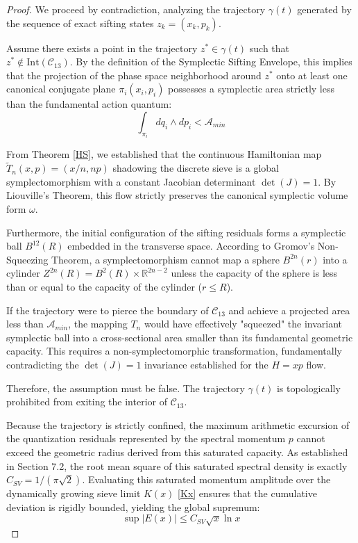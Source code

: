 \documentclass[sn-mathphys-num, pdflatex]{sn-jnl}
\begin{document}
\begin{proof}
We proceed by contradiction, analyzing the trajectory $\gamma(t)$ generated by the sequence of exact sifting states $z_k = (x_k, p_k)$. 

Assume there exists a point in the trajectory $z^* \in \gamma(t)$ such that $z^* \notin \text{Int}(\mathcal{C}_{13})$. By the definition of the Symplectic Sifting Envelope, this implies that the projection of the phase space neighborhood around $z^*$ onto at least one canonical conjugate plane $\pi_i(x_i, p_i)$ possesses a symplectic area strictly less than the fundamental action quantum:
$$ \int_{\pi_i} dq_i \wedge dp_i < \mathcal{A}_{min} $$

From Theorem \ref{HS}, we established that the continuous Hamiltonian map $\tilde{T}_n(x,p) = (x/n, np)$ shadowing the discrete sieve is a global symplectomorphism with a constant Jacobian determinant $\det(J) = 1$. By Liouville's Theorem, this flow strictly preserves the canonical symplectic volume form $\omega$. 

Furthermore, the initial configuration of the sifting residuals forms a symplectic ball $B^{12}(R)$ embedded in the transverse space. According to Gromov's Non-Squeezing Theorem, a symplectomorphism cannot map a sphere $B^{2n}(r)$ into a cylinder $Z^{2n}(R) = B^2(R) \times \mathbb{R}^{2n-2}$ unless the capacity of the sphere is less than or equal to the capacity of the cylinder ($r \le R$).

If the trajectory were to pierce the boundary of $\mathcal{C}_{13}$ and achieve a projected area less than $\mathcal{A}_{min}$, the mapping $T_n$ would have effectively "squeezed" the invariant symplectic ball into a cross-sectional area smaller than its fundamental geometric capacity. This requires a non-symplectomorphic transformation, fundamentally contradicting the $\det(J) = 1$ invariance established for the $H=xp$ flow.

Therefore, the assumption must be false. The trajectory $\gamma(t)$ is topologically prohibited from exiting the interior of $\mathcal{C}_{13}$. 

Because the trajectory is strictly confined, the maximum arithmetic excursion of the quantization residuals represented by the spectral momentum $p$ cannot exceed the geometric radius derived from this saturated capacity. As established in Section 7.2, the root mean square of this saturated spectral density is exactly $C_{SV} = 1/(\pi\sqrt{2})$. Evaluating this saturated momentum amplitude over the dynamically growing sieve limit $K(x)$ \ref{Kx} ensures that the cumulative deviation is rigidly bounded, yielding the global supremum:
$$ \sup |E(x)| \le C_{SV} \sqrt{x} \ln x $$
\end{proof}
\end{document}
